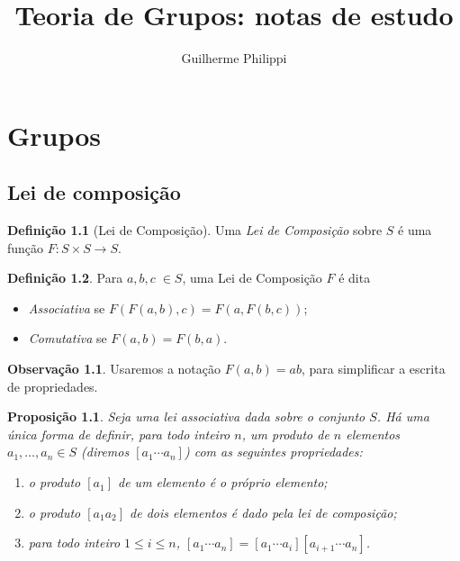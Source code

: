 \documentclass[a4paper,12pt]{report}
\title{Teoria de Grupos: notas de estudo}
\author{Guilherme Philippi}
\theoremstyle{plain}
\newtheorem{proposicao}{Proposição}[section]
\theoremstyle{definition}
\newtheorem{definicao}{Definição}[section]
\newtheorem{observacao}{Observação}[section]
\begin{document}
\maketitle
\tableofcontents

\chapter{Grupos}

\section{Lei de composição}

\begin{definicao}[Lei de Composição]
	Uma \emph{Lei de Composição} sobre \(S\) é uma função \(F: S\times S \longrightarrow S\).
\end{definicao}


\begin{definicao}
	Para $a,b,c \; \in S$, uma Lei de Composição $F$ é dita
	
	\begin{itemize}
		\item \emph{Associativa} se \(F(F(a,b),c) = F(a,F(b,c))\);
		\item \emph{Comutativa} se \(F(a,b) = F(b,a)\).
	\end{itemize}
\end{definicao}

\begin{observacao}
	Usaremos a notação \(F(a,b) = ab\), para simplificar a escrita de
	propriedades.
\end{observacao}

\begin{proposicao}
	Seja uma lei associativa dada sobre o conjunto
	\(S\). Há uma única forma de definir, para todo inteiro \(n\), um
	produto de \(n\) elementos \(a_1,\dots,a_n \in S\) (diremos
	\([a_1\dotsb a_n]\)) com as seguintes propriedades:
	
	\begin{enumerate}
		\def\labelenumi{\arabic{enumi}.}
		\item
		o produto \([a_1]\) de um elemento é o próprio elemento;
		\item
		o produto \([a_1a_2]\) de dois elementos é dado pela lei de
		composição;
		\item
		para todo inteiro \(1\leq i\leq n\),
		\([a_1\dotsb a_n] = [a_1\dotsb a_i][a_{i+1}\dotsb a_n]\).
	\end{enumerate}
\end{proposicao}
\end{document}
